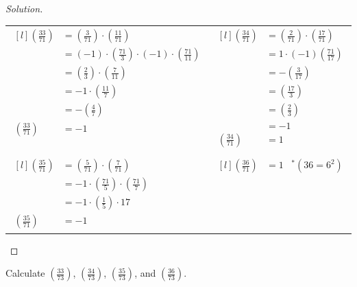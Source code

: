 \documentclass[11pt]{article}
\newcommand\leg[2]{\left(\frac{#1}{#2}\right)}
\newenvironment{problem}[2][Problem]{\begin{trivlist}
\item[\hskip \labelsep {\bfseries #1}\hskip \labelsep {\bfseries #2.}]}{\end{trivlist}}
\newenvironment{solution}
  {\renewcommand\qedsymbol{$~$}\begin{proof}[Solution]$ $\par\nobreak\ignorespaces}
  {\end{proof}}
\begin{document}
\begin{solution}
  \renewcommand{\arraystretch}{1.3}
  \begin{NiceTabular}[width=0.95\textwidth]{X[l] !{\qquad} X[l]}
    $\begin{matrix*}[l]
         \leg{33}{71} &= \leg{3}{71}\cdot \leg{11}{71} \\
         &= (-1) \cdot \leg{71}{3} \cdot (-1) \cdot \leg{71}{11} \\
         &= \leg{2}{3} \cdot \leg{7}{11} \\
         &= -1 \cdot \leg{11}{7} \\
         &= -\leg{4}{7} \\
         \leg{33}{71} &= -1 \\
         \phantom{a}
       \end{matrix*}$
     &
    $\begin{matrix*}[l]
         \leg{34}{71} &= \leg{2}{71} \cdot \leg{17}{71} \\
         &= 1 \cdot (-1)\leg{71}{17} \\
         &= -\leg{3}{17} \\
         &=  \leg{17}{3} \\
         &= \leg{2}{3} \\
         &=  -1 \\
         \leg{34}{71} &= 1
       \end{matrix*}$ \\
    \phantom{space}                                 \\
    $\begin{matrix*}[l]
         \leg{35}{71} &=  \leg{5}{71} \cdot \leg{7}{71} \\
         &= -1 \cdot \leg{71}{5} \cdot \leg{71}{7} \\
         &= -1 \cdot \leg{1}{5} \cdot {1}{7} \\
         \leg{35}{71}  &= -1
       \end{matrix*}$
     &
    $\begin{matrix*}[l]
         \leg{36}{71} &= 1 \;\;\; ^*(36=6^2) \\
         ~\\
         ~\\
         ~\\
       \end{matrix*}$
  \end{NiceTabular}
  \renewcommand{\arraystretch}{1}
\end{solution}


\begin{problem}{6}
Calculate $\leg{33}{73}$, $\leg{34}{73}$, $\leg{35}{73}$, and $\leg{36}{73}.$
\end{problem}
\end{document}
